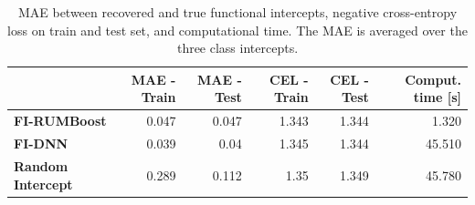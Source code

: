 \begin{table}[htbp]
\caption{MAE between recovered and true functional intercepts, negative cross-entropy loss on train and test set, and computational time. The MAE is averaged over the three class intercepts.}
\label{tab:synthetic_benchmark}
\begin{tabular}{lrrrrr}
\toprule
 & MAE - Train & MAE - Test & CEL - Train & CEL - Test & Comput. time [s] \\
\midrule
\textbf{FI-RUMBoost} & 0.047 & 0.047 & 1.343 & 1.344 & 1.320 \\
\textbf{FI-DNN} & 0.039 & 0.04 & 1.345 & 1.344 & 45.510 \\
\textbf{Random Intercept} & 0.289 & 0.112 & 1.35 & 1.349 & 45.780 \\
\bottomrule
\end{tabular}
\end{table}

